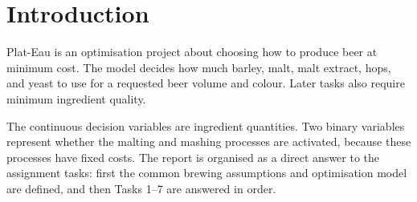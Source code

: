 \section{Introduction}
\label{sec:introduction}
 Plat-Eau is an optimisation project about choosing how to produce beer at minimum cost. The model decides how much barley, malt, malt extract, hops, and yeast to use for a requested beer volume and colour. Later tasks also require minimum ingredient quality.

The continuous decision variables are ingredient quantities. Two binary variables represent whether the malting and mashing processes are activated, because these processes have fixed costs. The report is organised as a direct answer to the assignment tasks: first the common brewing assumptions and optimisation model are defined, and then Tasks 1--7 are answered in order.
